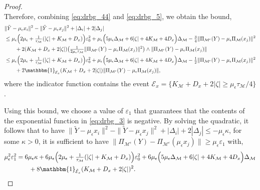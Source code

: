 \documentclass[10pt]{article}
\theoremstyle{plain}
\theoremstyle{definition}
\theoremstyle{remark}
\newcommand{\M}{{\mathcal{M}}}
\newcommand{\Pieps}{\Pi_{\M^\epsilon}}
\newcommand{\gap}{\Delta_\M}
\begin{document}
\begin{proof}
\begin{equation}
\end{equation}
Therefore, combining \eqref{eq:drbg_44} and \eqref{eq:drbg_5}, we obtain the bound,
\begin{align*}
    &\|\tilde{Y} - \mu_\epsilon x_i\|^2-\|\tilde{Y} - \mu_\epsilon x_j\|^2 + |\Delta_i| + 2|\Delta_j|\\
    & \leq \mu_\epsilon \Big ( 2\mu_\epsilon + \tfrac{1}{\tau_\M} (|\zeta| + K_\M + D_x) \Big ) \varepsilon_0^2 + \mu_\epsilon \Big ( 5 \mu_\epsilon \gap + 6 |\zeta| + 4 K_\M + 4 D_x \Big ) \gap - \tfrac{3}{4} \|\Pieps(Y) - \mu_\epsilon \Pi_\M(x_j)\|^2\\
    & \qquad + 2 (K_\M + D_x + 2 |\zeta|) \big ( \tfrac{1}{2 \mu_\epsilon \tau_\M}\|\Pieps(Y) - \mu_\epsilon \Pi_\M(x_j)\|^2 \big ) \wedge \|\Pieps(Y) - \mu_\epsilon \Pi_\M(x_j)\|\\
    & \leq \mu_\epsilon \Big ( 2\mu_\epsilon + \tfrac{1}{\tau_\M} (|\zeta| + K_\M + D_x) \Big ) \varepsilon_0^2 + \mu_\epsilon \Big ( 5 \mu_\epsilon \gap + 6 |\zeta| + 4 K_\M + 4 D_x \Big ) \gap - \tfrac{1}{2} \|\Pieps(Y) - \mu_\epsilon \Pi_\M(x_j)\|^2\\
    & \qquad + 2 \mathbbm{1}_{\mathcal{E}_x} (K_\M + D_x + 2 |\zeta|) \|\Pieps(Y) - \mu_\epsilon \Pi_\M(x_j)\|,
\end{align*}
where the indicator function contains the event \(\mathcal{E}_x = \{ K_\M + D_x + 2 |\zeta| \geq \mu_\epsilon \tau_\M / 4 \}\).

Using this bound, we choose a value of \(\varepsilon_1\) that guarantees that the contents of the exponential function in \eqref{eq:drbg_3} is negative.
By solving the quadratic, it follows that to have \(\|\tilde{Y} - \mu_\epsilon x_i\|^2-\|\tilde{Y} - \mu_\epsilon x_j\|^2 + |\Delta_i| + 2|\Delta_j| \leq - \mu_\epsilon \kappa\), for some \(\kappa > 0\), it is sufficient to have \(\|\Pieps(Y) - \Pieps(\mu_\epsilon x_j)\| \geq \mu_\epsilon \varepsilon_1\) with,
\begin{align}
    \mu_\epsilon^2 \varepsilon_1^2 &= 6 \mu_\epsilon \kappa + 6 \mu_\epsilon \Big ( 2\mu_\epsilon + \tfrac{1}{\tau_\M} (|\zeta| + K_\M + D_x) \Big ) \varepsilon_0^2 + 6 \mu_\epsilon \Big ( 5 \mu_\epsilon \gap + 6 |\zeta| + 4 K_\M + 4 D_x \Big ) \gap \nonumber\\
    & \qquad + 8 \mathbbm{1}_{\tilde{\mathcal{E}}_x} (K_\M + D_x + 2 |\zeta|)^2.\label{eq:drbg_2}
\end{align}


\end{proof}
\end{document}
